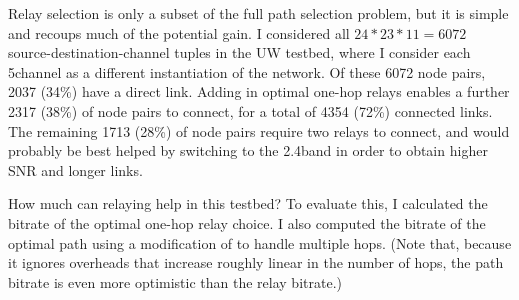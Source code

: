 Relay selection is only a subset of the full path selection problem, but it is simple and recoups much of the potential gain. I considered all $24*23*11=6072$ source-destination-channel tuples in the UW testbed, where I consider each 5\GHz channel as a different instantiation of the network. Of these 6072 node pairs, 2037 (34\%) have a direct link. Adding in optimal one-hop relays enables a further 2317 (38\%) of node pairs to connect, for a total of 4354 (72\%) connected links. The remaining 1713 (28\%) of node pairs require two relays to connect, and would probably be best helped by switching to the 2.4\GHz band in order to obtain higher SNR and longer links.

How much can relaying help in this testbed? To evaluate this, I calculated the bitrate of the optimal one-hop relay choice. I also computed the bitrate of the optimal path using a modification of  to handle multiple hops. (Note that, because it ignores overheads that increase roughly linear in the number of hops, the path bitrate is even more optimistic than the relay bitrate.)

